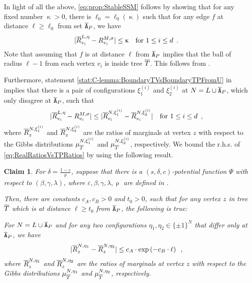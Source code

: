 \documentclass[11pt,reqno]{amsart}
\numberwithin{equation}{section}
\newtheorem{claim}[theorem]{Claim}
\newcommand{\applegreen}[1]{ {\color{applegreen}#1}}
\newcommand{\blue}[1]{{\color{blue}#1}}
\newcommand{\capri}[1]{{\color{capri}#1}}
\newcommand{\cadmiumgreen}[1]{{\color{cadmiumgreen}#1}}
\newcommand{\cadmiumorange}[1]{{\color{cadmiumorange}#1}}
\newcommand{\darkmagenta}[1]{{\color{darkmagenta}#1}}
\newcommand{\deeppink}[1]{{\color{deeppink}#1}}
\newcommand{\electricviolet}[1]{{\color{electricviolet}#1}}
\newcommand{\potF}{{\Psi}}
\newcommand{\pfs}{\darkmagenta{s}}
\newcommand{\abs}[1]{\blue{|}#1\blue{|}}
\renewcommand{\applegreen}[1]{#1}
\renewcommand{\blue}[1]{#1}
\renewcommand{\capri}[1]{#1}
\renewcommand{\cadmiumgreen}[1]{#1}
\renewcommand{\cadmiumorange}[1]{#1}
\renewcommand{\darkmagenta}[1]{#1}
\renewcommand{\deeppink}[1]{#1}
\renewcommand{\electricviolet}[1]{#1}
\newcommand{\kf}{\deeppink{f}}
\newcommand{\ki}{\capri{i}}
\newcommand{\kL}{\cadmiumorange{L}}
\newcommand{\kell}{{\color{green(pigment)}\ell}}%
\newcommand{\kt}{\cadmiumorange{t}}
\newcommand{\kv}{\electricviolet{v}}
\newcommand{\kz}{\cadmiumgreen{z}}
\renewcommand{\kf}{f}
\renewcommand{\ki}{i}
\renewcommand{\kL}{L}
\renewcommand{\kell}{\ell}
\renewcommand{\kt}{t}
\renewcommand{\kv}{v}
\renewcommand{\kz}{z}
\newcommand{\SingBound}{\uprho}
\begin{document}
In light of all the above, \eqref{eq:prop:StableSSM} follows by showing that for any fixed number 
$\upkappa>0$,  there is $\ell_0=\ell_0(\upkappa)$ such that for any edge 
$\kf$ at distance $\kell\geq \ell_0$ from set $\overline{{\tt A}}_{P}$, we have
%
\begin{align}\label{eq:Target4prop:StableSSM}
\abs{ \ratioTP^{\kL, \eta}_{\kv_{\ki}}-\ratioT^{M, \sigma}_{\kv_{\ki}} } &\leq \upkappa & \textrm{for } 1\leq \ki\leq d\enspace. 
\end{align} 
Note that assuming that  $\kf$ is at distance $\kell$ from $\overline{{\tt A}}_{P}$ implies that the ball of radius  
$\kell-1$ from each vertex $\kv_{\ki}$ is inside  tree  $\SMTPu$.  This follows from 
. 



Furthermore, statement \ref{stat:C-lemma:BoundaryTVsBoundaryTPFromU} in  implies that there is a pair of
configurations $\xi^{(\ki)}_1$ and $\xi^{(\ki)}_2$ at $N=\kL\cup \cpTP$, which only disagree at $\overline{{\tt A}}_{P}$, such that 
\begin{align} \label{eq:RealRatiosVsTPRatios}
\abs{ \ratioTP^{\kL, \eta}_{\kv_{\ki}}-\ratioT^{M, \sigma}_{\kv_{\ki}} } &\leq 
\abs{ \ratioTP^{N, \xi^{(\ki)}_1}_{\kv_{\ki}}-\ratioTP^{N, \xi^{(\ki)}_2}_{\kv_{\ki}} } & \textrm{for } 1\leq \ki\leq d
\enspace,
\end{align}
where $\ratioTP^{N, \xi^{(\ki)}_1}_{\kz}$ and $\ratioTP^{N, \xi^{(\ki)}_2}_{\kz}$ are the ratios of marginals at vertex $\kz$ with respect
to the Gibbs distributions $\mu^{N, \xi^{(\ki)}_1}_{\SMTPu}$ and $\mu^{N, \xi^{(\ki)}_2}_{\SMTPu}$, respectively.
%
We bound the r.h.s. of \eqref{eq:RealRatiosVsTPRatios} by using the following result. 



 \begin{claim} \label{claim:Target4prop:StableSSM}
For $\delta= \frac{1-\varepsilon}{\SingBound}$, suppose that there
is a $(\pfs,\delta,c)$-potential function $\potF$ with respect to $(\beta,\gamma,\lambda)$, 
where $\varepsilon, \beta,\gamma, \lambda,\SingBound$ are defined in . 

Then, there are constants $c_A, c_B>0$ and $t_0>0$, such that for any vertex $\kz$ in tree $\SMTPu$ which is at 
distance $\kell\geq \kt_0$ from $\overline{{\tt A}}_{P}$, the following is true:

For $N=\kL\cup \cpTP$ and for {\em any} two configurations $\eta_1, \eta_2\in \{\pm 1\}^{N }$
that differ only at $\overline{{\tt A}}_{P}$, we have 
\begin{align}\label{eq:ClaimTarget4prop:StableSSM}
\abs{ \ratioTP^{N, \eta_1}_{\kz} - \ratioTP^{N, \eta_2}_{\kz}} \leq c_A \cdot \exp\left( -c_B \cdot \kell \right)\enspace,
\end{align}
where $\ratioTP^{N, \eta_1}_{\kz}$ and $\ratioTP^{N, \eta_2}_{\kz}$ are the ratios of marginals at vertex $\kz$ with respect
to the Gibbs distributions $\mu^{N, \eta_1}_{\SMTPu}$ and $\mu^{N, \eta_2}_{\SMTPu}$, respectively.
 \end{claim}
\end{document}
